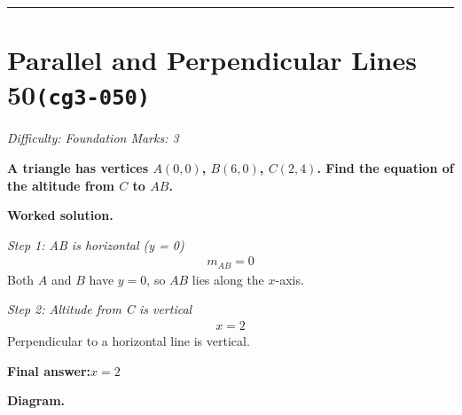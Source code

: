 \documentclass[11pt]{article}
\newcommand{\question}[1]{\par\medskip\noindent\textbf{#1}\par}
\begin{document}
\medskip\hrule

\section*{Parallel and Perpendicular Lines 50\quad\small\texttt{(cg3-050)}}
\textit{Difficulty: Foundation \quad\textbar\quad Marks: 3}

\question{A triangle has vertices \( A(0, 0) \), \( B(6, 0) \), \( C(2, 4) \). Find the equation of the altitude from \( C \) to \( AB \).}

\textbf{Worked solution.}

\textit{Step 1: AB is horizontal (y = 0)}
\[\begin{gathered}
m_{AB} = 0
\end{gathered}\]
Both \( A \) and \( B \) have \( y = 0 \), so \( AB \) lies along the \( x \)-axis.

\textit{Step 2: Altitude from C is vertical}
\[\begin{gathered}
x = 2
\end{gathered}\]
Perpendicular to a horizontal line is vertical.

\begin{answerbox}
\textbf{Final answer:}\quad \(\displaystyle x = 2\)
\end{answerbox}
\textbf{Diagram.}
\end{document}
